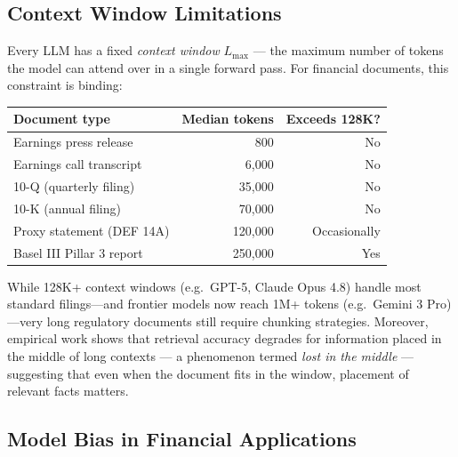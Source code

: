\begin{deepdive}
\subsection{Context Window Limitations}
\label{sec:llm-context-limits}

Every LLM has a fixed \emph{context window} $L_{\max}$ — the maximum
number of tokens the model can attend over in a single forward pass.  For
financial documents, this constraint is binding:

\begin{center}
  \label{tab:context-windows}
  \begin{tabular}{lrr}
    \toprule
    Document type & Median tokens & Exceeds 128K? \\
    \midrule
    Earnings press release & 800    & No  \\
    Earnings call transcript & 6{,}000 & No  \\
    10-Q (quarterly filing) & 35{,}000 & No  \\
    10-K (annual filing)    & 70{,}000 & No  \\
    Proxy statement (DEF 14A) & 120{,}000 & Occasionally \\
    Basel III Pillar 3 report & 250{,}000 & Yes \\
    \bottomrule
  \end{tabular}
\end{center}

While 128K+ context windows (e.g.\ GPT-5, Claude Opus 4.8) handle most standard
filings---and frontier models now reach 1M+ tokens (e.g.\ Gemini 3 Pro)---very long
regulatory documents still require chunking strategies.
Moreover, empirical work shows that retrieval accuracy degrades for
information placed in the middle of long contexts — a phenomenon termed
\emph{lost in the middle} \cite{liu2023lost}
— suggesting that even when the document fits in the window, placement
of relevant facts matters.

\subsection{Model Bias in Financial Applications}
\label{sec:llm-bias}


\end{deepdive}
